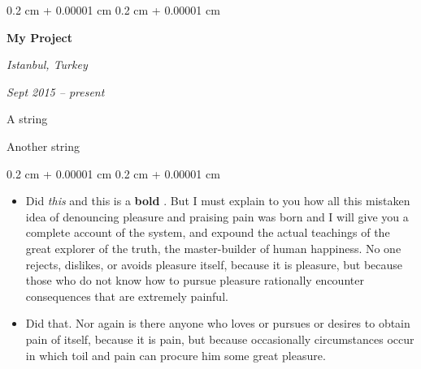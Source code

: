 \documentclass[10pt, letterpaper]{article}
\newenvironment{summary}{
    \begin{description}[
        topsep=0.10 cm,
        parsep=0.10 cm,
        partopsep=0pt,
        itemsep=0pt,
        leftmargin=0.4 cm + 10pt
    ]
}{
    \end{description}
} %
\newenvironment{highlights}{
    \begin{itemize}[
        topsep=0.10 cm,
        parsep=0.10 cm,
        partopsep=0pt,
        itemsep=0pt,
        leftmargin=0.4 cm + 10pt
    ]
}{
    \end{itemize}
} %
\newenvironment{onecolentry}{
    \begin{adjustwidth}{
        0.2 cm + 0.00001 cm
    }{
        0.2 cm + 0.00001 cm
    }
}{
    \end{adjustwidth}
} %
\newenvironment{twocolentry}[2][]{
    \onecolentry
    \def\secondColumn{#2}
    \setcolumnwidth{\fill, 4.5 cm}
    \begin{paracol}{2}
}{
    \switchcolumn \raggedleft \secondColumn
    \end{paracol}
    \endonecolentry
} %
\let\hrefWithoutArrow\href
\renewcommand{\href}[2]{\hrefWithoutArrow{#1}{\ifthenelse{\equal{#2}{}}{ }{#2 }\raisebox{.15ex}{\footnotesize \faExternalLink*}}}
\begin{document}
        \begin{twocolentry}{
        \textit{Istanbul, Turkey}    
            
        \textit{Sept 2015 – present}}
            \textbf{My Project}
        \end{twocolentry}
            \begin{summary}
                \item A string
                \item Another string
            \end{summary}
        \vspace{0.10 cm}
        \begin{onecolentry}
            \begin{highlights}
                \item Did \textit{this} and this is a \textbf{bold} \href{https://example.com}{link}. But I must explain to you how all this mistaken idea of denouncing pleasure and praising pain was born and I will give you a complete account of the system, and expound the actual teachings of the great explorer of the truth, the master-builder of human happiness. No one rejects, dislikes, or avoids pleasure itself, because it is pleasure, but because those who do not know how to pursue pleasure rationally encounter consequences that are extremely painful.
                \item Did that. Nor again is there anyone who loves or pursues or desires to obtain pain of itself, because it is pain, but because occasionally circumstances occur in which toil and pain can procure him some great pleasure.
            \end{highlights}
        \end{onecolentry}


        \vspace{0.2 cm}
\end{document}
